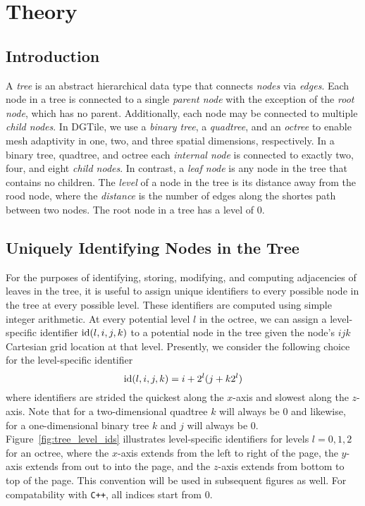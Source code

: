 \section{Theory}

\subsection{Introduction}

A \emph{tree} is an abstract hierarchical data type that connects \emph{nodes}
via \emph{edges}. Each node in a tree is connected to a single \emph{parent
node} with the exception of the \emph{root node}, which has no parent.
Additionally, each node may be connected to multiple \emph{child nodes}.
In DGTile, we use a \emph{binary tree}, a \emph{quadtree}, and an \emph{octree}
to enable mesh adaptivity in one, two, and three spatial dimensions,
respectively. In a binary tree, quadtree, and octree each \emph{internal node}
is connected to exactly two, four, and eight \emph{child nodes}. In contrast,
a \emph{leaf node} is any node in the tree that contains no children. The
\emph{level} of a node in the tree is its distance away from the rood node,
where the \emph{distance} is the number of edges along the shortes path
between two nodes. The root node in a tree has a level of $0$.

\subsection{Uniquely Identifying Nodes in the Tree}



For the purposes of identifying, storing, modifying, and computing adjacencies
of leaves in the tree, it is useful to assign unique identifiers to every
possible node in the tree at every possible level. These identifiers are
computed using simple integer arithmetic. At every potential level $l$ in the
octree, we can assign a level-specific identifier $\text{id}(l,i,j,k)$ to a
potential node in the tree given the node's $ijk$ Cartesian grid location
at that level. Presently, we consider the following choice for the
level-specific identifier
%
\begin{equation}
\text{id}(l,i,j,k) = i + 2^l(j + k 2^l)
\end{equation}
%
where identifiers are strided the quickest along the $x$-axis and slowest
along the $z$-axis. Note that for a two-dimensional quadtree $k$ will always
be $0$ and likewise, for a one-dimensional binary tree $k$ and $j$ will always
be $0$. Figure~\ref{fig:tree_level_ids} illustrates level-specific identifiers
for levels $l=0,1,2$ for an octree, where the $x$-axis extends from the left to
right of the page, the $y$-axis extends from out to into the page, and the
$z$-axis extends from bottom to top of the page. This convention will be used
in subsequent figures as well. For compatability with \texttt{C++}, all indices
start from $0$.

